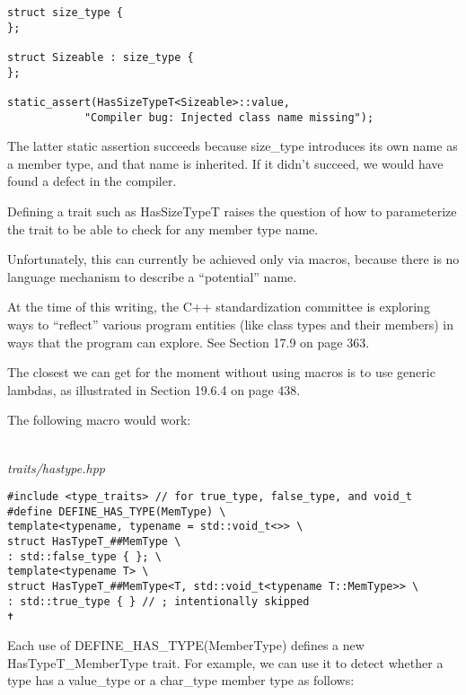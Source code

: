 \begin{lstlisting}[style=styleCXX]
struct size_type {
};

struct Sizeable : size_type {
};

static_assert(HasSizeTypeT<Sizeable>::value,
			"Compiler bug: Injected class name missing");
\end{lstlisting}

The latter static assertion succeeds because size\_type introduces its own name as a member type, and that name is inherited. If it didn’t succeed, we would have found a defect in the compiler.


Defining a trait such as HasSizeTypeT raises the question of how to parameterize the trait to be able to check for any member type name.

Unfortunately, this can currently be achieved only via macros, because there is no language mechanism to describe a “potential” name.

\begin{tcolorbox}[colback=webgreen!5!white,colframe=webgreen!75!black]
\hspace*{0.75cm}At the time of this writing, the C++ standardization committee is exploring ways to “reflect” various program entities (like class types and their members) in ways that the program can explore. See Section 17.9 on page 363.
\end{tcolorbox}

The closest we can get for the moment without using macros is to use generic lambdas, as illustrated in Section 19.6.4 on page 438. 

The following macro would work:

\hspace*{\fill} \\ %
\noindent
\textit{traits/hastype.hpp}
\begin{lstlisting}[style=styleCXX]
#include <type_traits> // for true_type, false_type, and void_t
#define DEFINE_HAS_TYPE(MemType) \
template<typename, typename = std::void_t<>> \
struct HasTypeT_##MemType \
: std::false_type { }; \
template<typename T> \
struct HasTypeT_##MemType<T, std::void_t<typename T::MemType>> \
: std::true_type { } // ; intentionally skipped
✝ 
\end{lstlisting}

Each use of DEFINE\_HAS\_TYPE(MemberType) defines a new HasTypeT\_MemberType trait. For example, we can use it to detect whether a type has a value\_type or a char\_type member type as follows:

